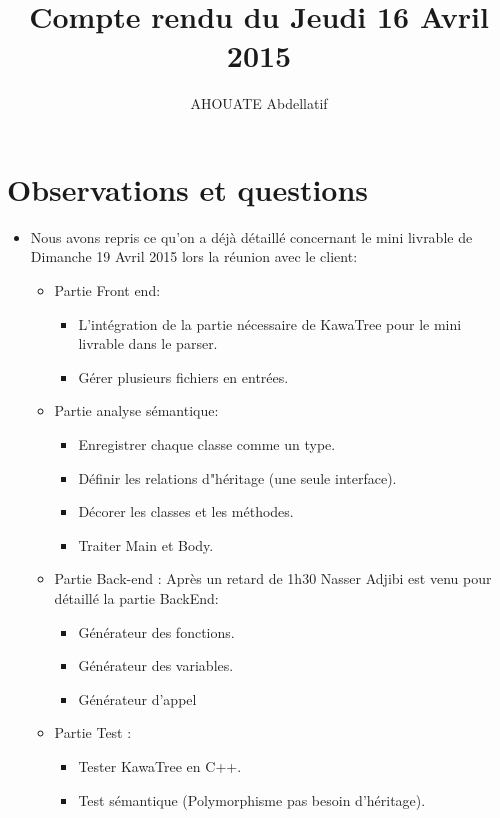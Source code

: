 \documentclass{../../../../../res/rapport}
\author{AHOUATE Abdellatif}
\title{Compte rendu du Jeudi 16 Avril 2015}
\begin{document}
    \maketitle
    \tableofcontents
    \clearpage
    
    \section{Observations et questions} 
    \label{sec:observations_et_questions}
    \begin{itemize}
	    \item Nous avons repris ce qu'on a déjà détaillé concernant le mini livrable de Dimanche 19 Avril 2015 lors la réunion avec le client:
            \begin{itemize}
        	\item Partie Front end:
 			\begin{itemize}
        			\item L'intégration de la partie nécessaire de KawaTree pour le mini livrable dans le parser. 
				\item Gérer plusieurs fichiers en entrées. 
				
        		\end{itemize}
		\item Partie analyse sémantique:
			\begin{itemize}
        			\item Enregistrer chaque classe comme un type.
				\item Définir les relations d"héritage (une seule interface).
				\item Décorer les classes et les méthodes.
				\item Traiter Main et Body. 					
        		\end{itemize}
		\item Partie Back-end : Après un retard de 1h30 Nasser Adjibi est venu pour détaillé la partie BackEnd:
			\begin{itemize}
        			\item Générateur des fonctions.
				\item Générateur des variables.
				\item Générateur d'appel 					
        		\end{itemize}
		
		\item Partie Test :
			\begin{itemize}
        			\item Tester KawaTree en C++.
				\item Test sémantique (Polymorphisme pas besoin d'héritage). 					
        		\end{itemize}


\end{itemize}
\end{itemize}
\end{document}
